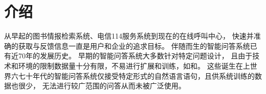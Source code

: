 \section{介绍}
\label{section:introduction}






从早起的图书情报检索系统、电信114服务系统到现在的在线呼叫中心，
快速并准确的获取与反馈信息一直是用户和企业的追求目标。
伴随而生的智能问答系统已有近70年的发展历史。
早期的智能问答系统大多数针对特定问题设计，
且由于技术和环境的限制数据量十分有限，不易进行扩展和训练，如\citet{Green-2}和\citet{Woods-3}。
这些诞生在上世界六七十年代的智能问答系统仅接受特定形式的自然语言语句，且供系统训练的数据也很少，
无法进行较广范围的问答从而未被广泛使用。

